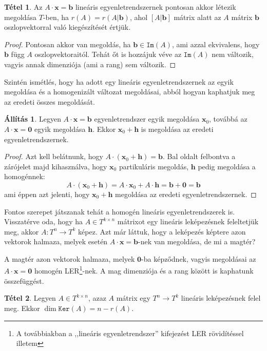 \documentclass[12pt]{book}
\theoremstyle{plain} %
\theoremstyle{definition} %
\newtheorem{all/}{Állítás}[section]
\newenvironment{all}
{\renewcommand{\qedsymbol}{$\clubsuit$}%
	\pushQED{\qed}\begin{all/}}
	{\popQED\end{all/}}
\newtheorem{theo/}{Tétel}[section]
\newenvironment{theo}
  {\renewcommand{\qedsymbol}{$\clubsuit$}%
   \pushQED{\qed}\begin{theo/}}
  {\popQED\end{theo/}}
\theoremstyle{remark}
\renewcommand\qedsymbol{$\blacksquare$}
\newcommand{\ve}[1]{\mathbf{#1}}
\numberwithin{equation}{section}  %
\begin{document}
	\begin{theo}
		Az $A\cdot \ve{x}= \ve{b} $ lineáris egyenletrendszernek pontosan akkor létezik megoldása $T$-ben, ha $r(A) = r(A|\ve{b})$, ahol $[A|\ve{b}]$ mátrix alatt az $A$ mátrix $\ve{b}$ oszlopvektorral való kiegészítését értjük. 
	\end{theo}
	
	\begin{proof}
		Pontosan akkor van megoldás, ha $\ve{b}\in \mathtt{Im}(A)$, ami azzal ekvivalens, hogy $\ve{b}$ függ $A$ oszlopvektoraitól. Tehát őt is hozzájuk véve az $\mathtt{Im}(A)$ nem változik, vagyis annak dimenziója (ami a rang) sem változik.
	\end{proof}
	
	Szintén ismétlés, hogy ha adott egy lineáris egyenletrendszernek az egyik megoldása és a homogenizált változat megoldásai, abból hogyan kaphatjuk meg az eredeti összes megoldását.
	
	\begin{all}
		Legyen $A\cdot \ve{x} = \ve{b}$ egyenletrendszer egyik megoldása $\ve{x}_0$, továbbá az $A\cdot \ve{x} = \ve{0}$ egyik megoldása $\ve{h}$. Ekkor $\ve{x}_0+\ve{h}$ is megoldása az eredeti egyenletrendszernek.
	\end{all}

	\begin{proof}
		Azt kell belátnunk, hogy $A\cdot (\ve{x}_0+\ve{h}) = \ve{b}$. Bal oldalt felbontva a zárójelet majd kihasználva, hogy $\ve{x}_0$ partikuláris megoldás, $\ve{h}$ pedig megoldása a homogénnek:
		\[A\cdot (\ve{x}_0+\ve{h}) = A\cdot \ve{x}_0 + A\cdot \ve{h} = \ve{b} + \ve{0} = \ve{b} \]
		ami éppen azt jelenti, hogy $\ve{x}_0+\ve{h}$ megoldása az eredeti egyenletrendszernek.
	\end{proof}
	
	Fontos szerepet játszanak tehát a homogén lineáris egyenletrendszerek is. Visszatérve oda, hogy ha $A\in T^{k\times n}$ mátrixot egy lineáris leképezésnek feleltetjük meg, akkor $A\colon T^n \to T^k$ képez. Azt már láttuk, hogy a leképezés képtere azon vektorok halmaza, melyek esetén $A\cdot \ve{x} = \ve{b}$-nek van megoldása, de mi a magtér?
	
	A magtér azon vektorok halmaza, melyek $\ve{0}$-ba képződnek, vagyis megoldásai az $A\cdot \ve{x} = \ve{0}$ homogén LER\footnote{A továbbiakban a ,,lineáris egyenletrendszer'' kifejezést LER rövidítéssel illetem}-nek. A mag dimenziója és a rang között is kaphatunk összefüggést.
	
	\begin{theo}
		Legyen $A\in T^{k\times n}$, azaz $A$ mátrix egy $T^n \to T^k$ lineáris leképezésnek felel meg. Ekkor $\dim \mathtt{Ker}(A) = n - r(A)$.
	\end{theo}
	
\end{document}
